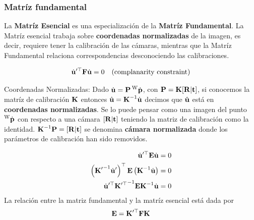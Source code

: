 \begin{frame}
    \frametitle{Matríz fundamental}
    \footnotesize
    
    La {\bf Matríz Esencial} es una especialización de la {\bf Matríz Fundamental}. La Matríz esencial trabaja sobre {\bf coordenadas  normalizadas}  de la imagen, es decir, requiere tener la calibración de las cámaras, mientras que la Matríz Fundamental relaciona correspondencias desconociendo las calibraciones.
    
    	\begin{equation*}
    	\dot{\boldsymbol{\mathbf{u}}}^{\prime\top} \boldsymbol{\mathbf{F}} \dot{\boldsymbol{\mathbf{u}}} = 0 \quad \text{(complanarity constraint)}
    \end{equation*}
    
    \begin{block}{Coordenadas Normalizadas:}
	    Dado $\dot{\boldsymbol{\mathbf{u}}} = \boldsymbol{\mathbf{P}} \prescript{\mathrm{\mathrm{W}}}{}{\dot{\boldsymbol{\mathbf{p}}}}$, con $\boldsymbol{\mathbf{P}} = \boldsymbol{\mathbf{K}} [\boldsymbol{\mathbf{R}}|\boldsymbol{\mathbf{t}}]$, si conocemos la matríz de calibración $\boldsymbol{\mathbf{K}}$ entonces $\hat{\boldsymbol{\mathbf{u}}} = {\boldsymbol{\mathbf{K}}}^{-1} \dot{\boldsymbol{\mathbf{u}}}$ decimos que $\hat{\boldsymbol{\mathbf{u}}}$ está en {\bf coordenadas normalizadas}. Se lo puede pensar como una imagen del punto $\prescript{\mathrm{\mathrm{W}}}{}{\dot{\boldsymbol{\mathbf{p}}}}$ con respecto a una cámara $[\boldsymbol{\mathbf{R}}|\boldsymbol{\mathbf{t}}]$ teniendo la matriz de calibración como la identidad. $ {\boldsymbol{\mathbf{K}}}^{-1} \boldsymbol{\mathbf{P}} = [\boldsymbol{\mathbf{R}}| \boldsymbol{\mathbf{t}}]$ se denomina {\bf cámara normalizada} donde los parámetros de calibración han sido removidos.
    \end{block}
    
    \begin{align*}
		\dot{\boldsymbol{\mathbf{u}}}^{\prime\top} \boldsymbol{\mathbf{E}} \dot{\boldsymbol{\mathbf{u}}} &= 0\\
		\left( {\boldsymbol{\mathbf{K}}^{\prime}}^{-1} \dot{\boldsymbol{\mathbf{u}}}^{\prime} \right)^{\top} \boldsymbol{\mathbf{E}} \left( {\boldsymbol{\mathbf{K}}}^{-1} \dot{\boldsymbol{\mathbf{u}}} \right) &= 0\\
		\dot{\boldsymbol{\mathbf{u}}}^{\prime\top} {\boldsymbol{\mathbf{K}}^{\prime\top}}^{-1} \boldsymbol{\mathbf{E}} {\boldsymbol{\mathbf{K}}}^{-1} \dot{\boldsymbol{\mathbf{u}}}&= 0
    \end{align*}
	La relación entre la matriz fundamental y la matríz esencial está dada por
    \begin{equation*}
		\boldsymbol{\mathbf{E}} = \boldsymbol{\mathbf{K}}^{\prime\top} \boldsymbol{\mathbf{F}} \boldsymbol{\mathbf{K}}
	\end{equation*}
    
\end{frame}

